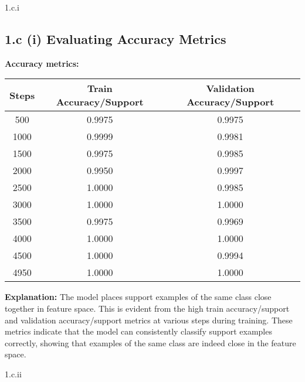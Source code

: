\clearpage

\LARGE
1.c.i
\normalsize

\begin{answer}
    \subsection*{1.c (i) Evaluating Accuracy Metrics}

\textbf{Accuracy metrics:}

\begin{tabular}{|c|c|c|}
\hline
\textbf{Steps} & \textbf{Train Accuracy/Support} & \textbf{Validation Accuracy/Support} \\
\hline
500 & 0.9975 & 0.9975 \\
\hline
1000 & 0.9999 & 0.9981 \\
\hline
1500 & 0.9975 & 0.9985 \\
\hline
2000 & 0.9950 & 0.9997 \\
\hline
2500 & 1.0000 & 0.9985 \\
\hline
3000 & 1.0000 & 1.0000 \\
\hline
3500 & 0.9975 & 0.9969 \\
\hline
4000 & 1.0000 & 1.0000 \\
\hline
4500 & 1.0000 & 0.9994 \\
\hline
4950 & 1.0000 & 1.0000 \\
\hline
\end{tabular}

\textbf{Explanation:} The model places support examples of the same class close together in feature space. This is evident from the high train accuracy/support and validation accuracy/support metrics at various steps during training. These metrics indicate that the model can consistently classify support examples correctly, showing that examples of the same class are indeed close in the feature space.

\end{answer}

\LARGE
1.c.ii
\normalsize

